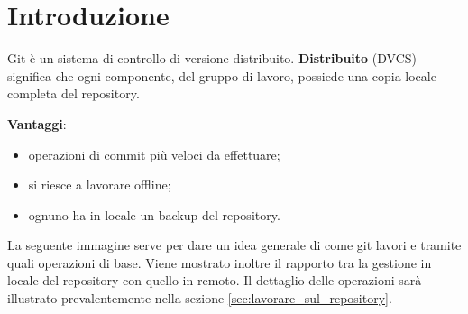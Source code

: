 %

\global\let\tikz@ensure@dollar@catcode=\relax %


\section{Introduzione} %
\label{sec:introduzione}
Git è un sistema di controllo di versione distribuito.
\newline
\textbf{Distribuito} (DVCS) significa che ogni componente, del gruppo di lavoro, possiede una copia locale completa del repository.
\newline

\noindent
\textbf{Vantaggi}:
	\begin{itemize}
		\item operazioni di commit più veloci da effettuare;
		\item si riesce a lavorare offline;
		\item ognuno ha in locale un backup del repository.
	\end{itemize}
	\noindent
	\newline
La seguente immagine serve per dare un idea generale di come git lavori e tramite quali operazioni di base. Viene mostrato inoltre il rapporto tra la gestione in locale del repository con quello in remoto. Il dettaglio delle operazioni sarà illustrato prevalentemente nella sezione \ref{sec:lavorare_sul_repository}.

